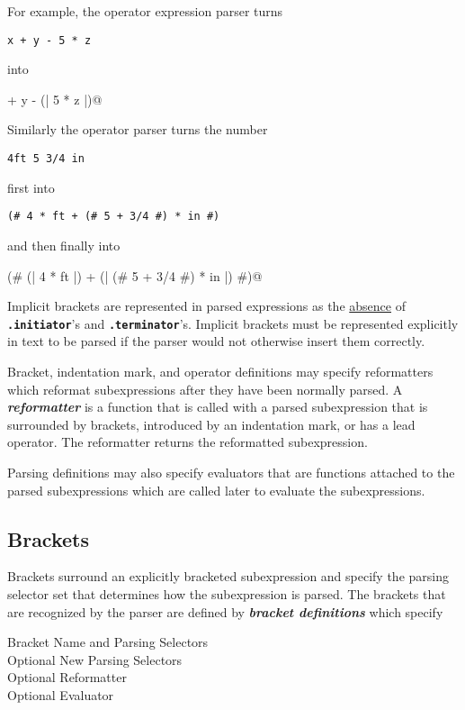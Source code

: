 \documentclass[12pt]{article}
\newcommand{\TT}[1]{{\tt \bfseries #1}}
\newcommand{\key}[1]{{\bf \em #1}\index{#1}}
\newcommand{\skey}[2]{{\bf \em #1#2}\index{#1}}
\newenvironment{indpar}[1][0.3in]%
	{\begin{list}{}%
		     {\setlength{\itemsep}{0in}%
		      \setlength{\topsep}{0in}%
		      \setlength{\parsep}{1ex}%
		      \setlength{\labelwidth}{#1}%
		      \setlength{\leftmargin}{#1}%
		      \addtolength{\leftmargin}{\labelsep}}%
	 \item}%
	{\end{list}}
\begin{document}
For example, the operator expression parser turns
\begin{center}
\verb|x + y - 5 * z|
\end{center}
into
\begin{center}
\verb@x + y - (| 5 * z |)@
\end{center}
Similarly the operator parser turns the number
\begin{center}
\verb|4ft 5 3/4 in|
\end{center}
first into
\begin{center}
\verb|(# 4 * ft + (# 5 + 3/4 #) * in #)|
\end{center}
and then finally into
\begin{center}
\verb@(# (| 4 * ft |) + (| (# 5 + 3/4 #) * in |) #)@
\end{center}

Implicit brackets are represented in parsed expressions as the
\underline{absence} of \TT{.initiator}'s
and \TT{.terminator}'s.  Implicit brackets must be represented
explicitly in text to be parsed if the parser would not otherwise
insert them correctly.

Bracket, indentation mark, and operator
definitions may specify reformatters
which reformat sub\-expressions after they have been normally parsed.
A \key{reformatter}\label{REFORMATTER} is a function that
is called with a parsed subexpression that is surrounded by brackets,
introduced by an indentation mark, or has a lead operator.
The reformatter returns the reformatted subexpression.

Parsing definitions may also specify evaluators
that are functions attached to the parsed subexpressions which
are called later to evaluate the subexpressions.

\subsection{Brackets}
\label{BRACKETS}

Brackets surround an explicitly bracketed
subexpression and specify the parsing
selector set that determines how the subexpression is parsed.
The brackets that are recognized by the parser
are defined by \skey{bracket definition}s which specify

\begin{indpar}[1in]
Bracket Name and Parsing Selectors \\
Optional New Parsing Selectors \\
Optional Reformatter \\
Optional Evaluator
\end{indpar}
\end{document}
